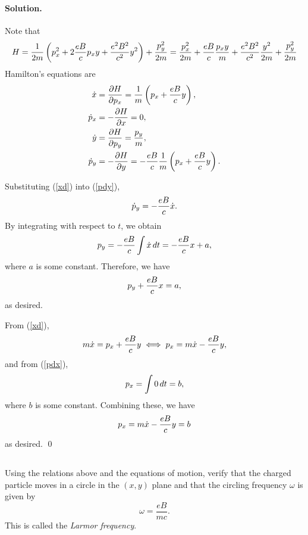 \documentclass[11pt]{article}
\newcommand{\refeq}[1]{(\ref{#1})}
\newcommand{\beq}{\begin{equation*}}
\newcommand{\eeq}{\end{equation*}}
\newcommand{\beqn}{\begin{equation}}
\newcommand{\eeqn}{\end{equation}}
\newenvironment{problem}
{
	\subsection{}
	\color{darkgray}
    \ignorespaces
}
{

}
\newenvironment{solution}
{
    \paragraph{Solution.}
    \ignorespaces
}
{
    \bigskip
}
\begin{document}
\begin{solution}
	Note that
	\beq
		H = \frac{1}{2m} \left( \px^2 + 2 \frac{e B}{c} \px y + \frac{e^2 B^2}{c^2} y^2 \right) + \frac{\py^2}{2m}
		= \frac{\px^2}{2m} + \frac{e B}{c} \frac{\px y}{m} + \frac{e^2 B^2}{c^2} \frac{y^2}{2m} + \frac{\py^2}{2m}
	\eeq
	Hamilton's equations are
	\begin{align}
		\dot{x} &= \pdv{H}{p_x} = \frac{1}{m} \left( p_x + \frac{e B}{c} y \right), \label{xd} \\
		\dot{p}_x &= -\pdv{H}{x} = 0, \label{pdx} \\
		\dot{y} &= \pdv{H}{p_y} = \frac{p_y}{m}, \label{yd} \\
		\dot{p}_y &= -\pdv{H}{y} = -\frac{e B}{c} \frac{1}{m} \left( p_x + \frac{e B}{c} y \right). \label{pdy}
	\end{align}
	
	Substituting \refeq{xd} into \refeq{pdy},
	\beq
		\pdy = -\frac{e B}{c} \xd.
	\eeq
	By integrating with respect to $t$, we obtain
	\beq
		\py = -\frac{e B}{c} \int \xd \dd{t} = -\frac{e B}{c} x + a,
	\eeq 
	where $a$ is some constant.  Therefore, we have
	\beqn \label{a}
		\py + \frac{e B}{c} x = a,
	\eeqn
	as desired.
	
	From \refeq{xd},
	\beq
		m \xd = \px + \frac{e B}{c} y
		\iff
		\px = m \xd - \frac{e B}{c} y,
	\eeq
	and from \refeq{pdx},
	\beq
		\px = \int 0 \dd{t} = b,
	\eeq
	where $b$ is some constant.  Combining these, we have
	\beqn \label{b}
		\px = m \xd - \frac{e B}{c} y = b
	\eeqn
	as desired. \qed
\end{solution}

\newcommand{\omg}{\omega}
\newcommand{\xdd}{\ddot{x}}
\newcommand{\ydd}{\ddot{y}}

\newcommand{\xc}{x_c}
\newcommand{\yc}{y_c}
\newcommand{\xddc}{\ddot{x}_c}
\newcommand{\yddc}{\ddot{y}_c}

\newcommand{\xxt}{x(t)}
\newcommand{\yyt}{y(t)}
\newcommand{\xct}{\xc(t)}
\newcommand{\yct}{\yc(t)}
\newcommand{\xpt}{x_p(t)}
\newcommand{\ypt}{y_p(t)}

\newcommand{\Cq}{C_1}
\newcommand{\Cw}{C_2}
\newcommand{\Dq}{D_1}
\newcommand{\Dw}{D_2}

\begin{problem}
	Using the relations above and the equations of motion, verify that the charged particle moves in a circle in the $(x, y)$ plane and that the circling frequency $\omg$ is given by
	\beq
		\omg = \frac{e B}{m c}.
	\eeq
This is called the \emph{Larmor frequency}.
\end{problem}
\end{document}

